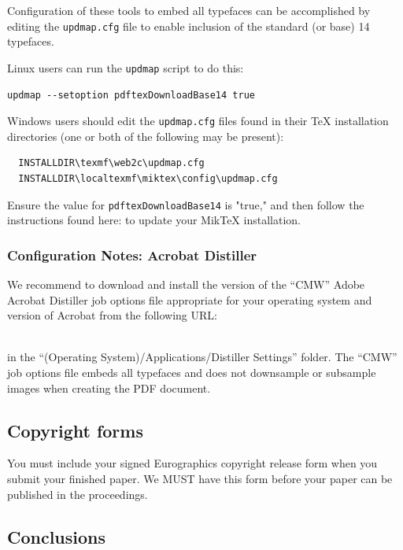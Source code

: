 \documentclass{egpubl-eurovis-short}
\begin{document}
\noindent
Configuration of these tools to embed all typefaces can be accomplished by editing the \texttt{updmap.cfg} file
to enable inclusion of the standard (or base) 14 typefaces.

Linux users can run the \texttt{updmap} script to do this:
\begin{verbatim}
updmap --setoption pdftexDownloadBase14 true
\end{verbatim}

Windows users should edit the \texttt{updmap.cfg} files found in their TeX installation directories (one or both
of the following may be present):
\begin{verbatim}
  INSTALLDIR\texmf\web2c\updmap.cfg
  INSTALLDIR\localtexmf\miktex\config\updmap.cfg
\end{verbatim}

Ensure the value for \texttt{pdftexDownloadBase14} is "true," and then follow the instructions found here:
 to update your MikTeX installation.

\subsubsection*{Configuration Notes: Acrobat Distiller}

We recommend to download and install the version of the ``CMW'' Adobe Acrobat Distiller job options file
appropriate for your operating system and version of Acrobat from the following URL:

\\
in the ``(Operating System)/Applications/Distiller Settings'' folder. The ``CMW'' job options file embeds
all typefaces and does not downsample or subsample images when creating the PDF document.
\subsection{Copyright forms}

You must include your signed Eurographics copyright release form
when you submit your finished paper. We MUST have this form before
your paper can be published in the proceedings.

\subsection{Conclusions}
\end{document}
